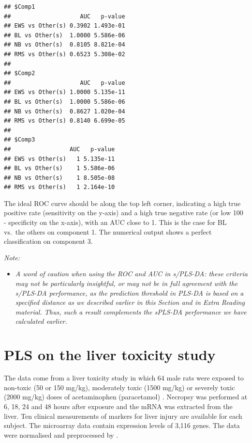 \documentclass[]{book}
\providecommand{\tightlist}{%
  \setlength{\itemsep}{0pt}\setlength{\parskip}{0pt}}
\begin{document}
\begin{verbatim}
## $Comp1
##                    AUC   p-value
## EWS vs Other(s) 0.3902 1.493e-01
## BL vs Other(s)  1.0000 5.586e-06
## NB vs Other(s)  0.8105 8.821e-04
## RMS vs Other(s) 0.6523 5.308e-02
## 
## $Comp2
##                    AUC   p-value
## EWS vs Other(s) 1.0000 5.135e-11
## BL vs Other(s)  1.0000 5.586e-06
## NB vs Other(s)  0.8627 1.020e-04
## RMS vs Other(s) 0.8140 6.699e-05
## 
## $Comp3
##                 AUC   p-value
## EWS vs Other(s)   1 5.135e-11
## BL vs Other(s)    1 5.586e-06
## NB vs Other(s)    1 8.505e-08
## RMS vs Other(s)   1 2.164e-10
\end{verbatim}














The ideal ROC curve should be along the top left corner, indicating a
high true positive rate (sensitivity on the y-axis) and a high true
negative rate (or low 100 - specificity on the x-axis), with an AUC
close to 1. This is the case for BL vs.~the others on component 1. The
numerical output shows a perfect classification on component 3.

\emph{Note:}

\begin{itemize}
\tightlist
\item
  \emph{A word of caution when using the ROC and AUC in s/PLS-DA: these
  criteria may not be particularly insightful, or may not be in full
  agreement with the s/PLS-DA performance, as the prediction threshold
  in PLS-DA is based on a specified distance as we described earlier in
  this Section and in Extra Reading material. Thus, such a result
  complements the sPLS-DA performance we have calculated earlier.}
\end{itemize}

\chapter{PLS on the liver toxicity study}\label{pls-liver-case}

The data come from a liver toxicity study in which 64 male rats were
exposed to non-toxic (50 or 150 mg/kg), moderately toxic (1500 mg/kg) or
severely toxic (2000 mg/kg) doses of acetaminophen (paracetamol)
\citep{Bus07}. Necropsy was performed at 6, 18, 24 and 48 hours after
exposure and the mRNA was extracted from the liver. Ten clinical
measurements of markers for liver injury are available for each subject.
The microarray data contain expression levels of 3,116 genes. The data
were normalised and preprocessed by \citet{Bus07}.
\end{document}
